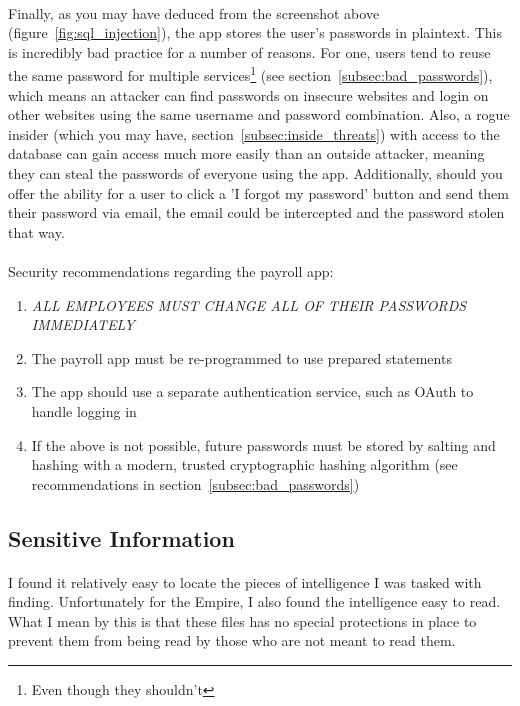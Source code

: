 \documentclass{article}
\begin{document}
\paragraph{}
Finally, as you may have deduced from the screenshot above (figure~\ref{fig:sql_injection}), the app stores the user's passwords in plaintext.
This is incredibly bad practice for a number of reasons.
For one, users tend to reuse the same password for multiple services\footnote{Even though they shouldn't} (see section~\ref{subsec:bad_passwords}), which means an attacker can find passwords on insecure websites and login on other websites using the same username and password combination.
Also, a rogue insider (which you may have, section~\ref{subsec:inside_threats}) with access to the database can gain access much more easily than an outside attacker, meaning they can steal the passwords of everyone using the app.
Additionally, should you offer the ability for a user to click a 'I forgot my password' button and send them their password via email, the email could be intercepted and the password stolen that way.

\paragraph{}
\begin{adjustwidth}{1.5cm}{1.5cm}
	Security recommendations regarding the payroll app:
	\begin{enumerate}
		\item \emph{ALL EMPLOYEES MUST CHANGE ALL OF THEIR PASSWORDS IMMEDIATELY}
		\item The payroll app must be re-programmed to use prepared statements
		\item The app should use a separate authentication service, such as OAuth to handle logging in
		\item If the above is not possible, future passwords must be stored by salting and hashing with a modern, trusted cryptographic hashing algorithm (see recommendations in section~\ref{subsec:bad_passwords})
	\end{enumerate}
\end{adjustwidth}

\subsection{Sensitive Information}
\label{subsec:sensitive_info}
\paragraph{}
I found it relatively easy to locate the pieces of intelligence I was tasked with finding.
Unfortunately for the Empire, I also found the intelligence easy to read.
What I mean by this is that these files has no special protections in place to prevent them from being read by those who are not meant to read them.
\end{document}
